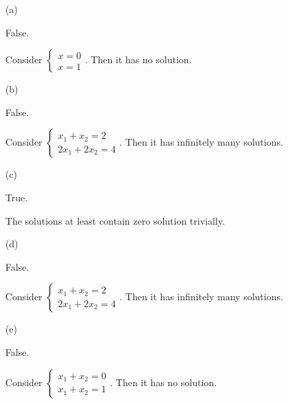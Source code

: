 \begin{Exercise}
	\begin{enumerate}[(a)]
		\item[(a)]
		\begin{answer}
			False.
		\end{answer}
		\begin{solution}
			Consider $\begin{cases}
			x = 0 \\
			x = 1
			\end{cases}$. Then it has no solution.
		\end{solution}
		
		\item[(b)]
		\begin{answer}
			False.
		\end{answer}
		\begin{solution}
			Consider $\begin{cases}
			x_1 + x_2 = 2 \\
			2x_1 + 2x_2 = 4
			\end{cases}$. Then it has infinitely many solutions.
		\end{solution}
		
		\item[(c)]
		\begin{answer}
			True.
		\end{answer}
		\begin{solution}
			The solutions at least contain zero solution trivially.
		\end{solution}
		
		\item[(d)]
		\begin{answer}
			False.
		\end{answer}
		\begin{solution}
			Consider $\begin{cases}
			x_1 + x_2 = 2 \\
			2x_1 + 2x_2 = 4
			\end{cases}$. Then it has infinitely many solutions.
		\end{solution}
		
		\item[(e)]
		\begin{answer}
			False.
		\end{answer}
		\begin{solution}
			Consider $\begin{cases}
			x_1 + x_2 = 0 \\
			x_1 + x_2 = 1
			\end{cases}$. Then it has no solution.
		\end{solution}
		

\end{enumerate}
\end{Exercise}
